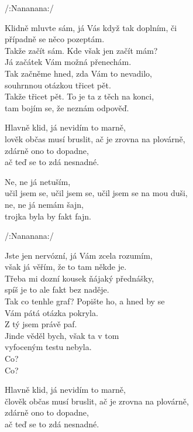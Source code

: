 
\re{}/:Nananana:/

\ve{}
Klidně mluvte sám, já Vás když tak doplním, či\\
případně se něco pozeptám.\\
Takže začít sám. Kde však jen začít mám?\\
Já začátek Vám možná přenechám.\\
Tak začněme hned, zda Vám to nevadilo,\\
souhrnnou otázkou třicet pět.\\
Takže třicet pět. To je ta z těch na konci,\\
tam bojím se, že neznám odpověď.

Hlavně klid, já nevidím to marně,\\
lověk občas musí bruslit, ač je zrovna na plovárně,\\
zdárně ono to dopadne,\\
ač teď se to zdá nesnadné.

\cho{}
Ne, ne já netuším,\\
učil jsem se, učil jsem se, učil jsem se na mou duši,\\
ne, ne já nemám šajn,\\
trojka byla by fakt fajn.

\re{}
/:Nananana:/

\ve{}
Jste jen nervózní, já Vám zcela rozumím,\\
však já věřím, že to tam někde je.\\
Třeba mi dozní kousek ňájaký přednášky,\\
spíš je to ale fakt bez naděje.\\
Tak co tenhle graf? Popište ho, a hned by se\\
Vám pátá otázka pokryla.\\
Z tý jsem právě paf.\\
Jinde věděl bych, však ta v tom\\
vyfoceným testu nebyla.\\
Co?\\
Co?

Hlavně klid, já nevidím to marně,\\
člověk občas musí bruslit, ač je zrovna na plovárně,\\
zdárně ono to dopadne,\\
ač teď se to zdá nesnadné.

